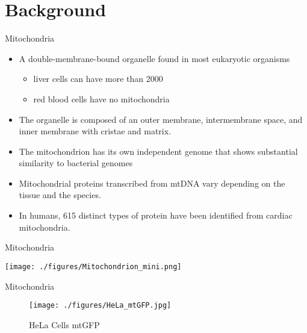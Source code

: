 \documentclass[presentation, smaller]{beamer}
\begin{document}
\section{Background}
\label{sec:org55c905b}
\begin{frame}[label={sec:orgf16b254}]{Mitochondria}
\begin{itemize}
\item A double-membrane-bound organelle found in most eukaryotic organisms
\begin{itemize}
\item liver cells can have more than 2000
\item red blood cells have no mitochondria
\end{itemize}

\item The organelle is composed of an outer membrane, intermembrane
space, and inner membrane with cristae and matrix.

\item The mitochondrion has its own independent genome that shows
substantial similarity to bacterial genomes

\item Mitochondrial proteins transcribed from mtDNA vary depending on the
tissue and the species.

\item In humans, 615 distinct types of protein have been identified from
cardiac mitochondria.
\end{itemize}
\end{frame}

\begin{frame}[label={sec:org1d20d1b}]{Mitochondria}
\begin{center}
\texttt{[image: ./figures/Mitochondrion\_mini.png]}
\end{center}
\end{frame}

\begin{frame}[label={sec:org2dc5e91}]{Mitochondria}
\begin{figure}[htbp]
\centering
\texttt{[image: ./figures/HeLa\_mtGFP.jpg]}
\caption[hela]{\label{fig:org59cf2ae}
HeLa Cells mtGFP}
\end{figure}
\end{frame}
\end{document}

